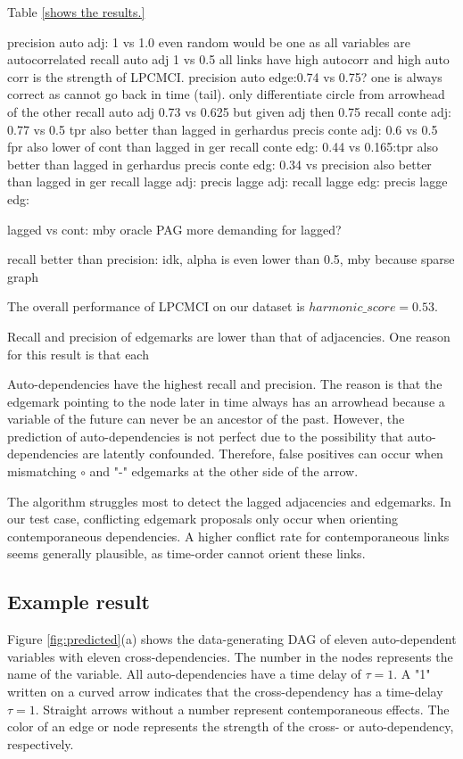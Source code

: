 \documentclass[conference]{IEEEtran}
\begin{document}
Table \ref{shows the results.} 

precision auto adj: 1 vs 1.0 even random would be one as all variables are autocorrelated
recall auto adj     1 vs 0.5 all links have high autocorr and high auto corr is the strength of LPCMCI.
precision auto edge:0.74 vs 0.75? one is always correct as cannot go back in time (tail). only differentiate circle from arrowhead of the other
recall auto adj     0.73 vs 0.625 but given adj then 0.75 
recall conte adj:   0.77 vs 0.5 tpr also better than lagged in gerhardus
precis conte adj:   0.6 vs 0.5 fpr also lower of cont than lagged in ger
recall conte edg:   0.44 vs 0.165:tpr also better than lagged in gerhardus
precis conte edg:   0.34 vs precision also better than lagged in ger
recall lagge adj:   
precis lagge adj:
recall lagge edg:   
precis lagge edg:

lagged vs cont: mby oracle PAG more demanding for lagged?

recall better than precision: idk, alpha is even lower than 0.5, mby because sparse graph

The overall performance of LPCMCI on our dataset is $harmonic\_score = 0.53$.


Recall and precision of edgemarks are lower than that of adjacencies. One reason for this result is that each 

Auto-dependencies have the highest recall and precision. The reason is that the edgemark pointing to the node later in time always has an arrowhead because a variable of the future can never be an ancestor of the past. However, the prediction of auto-dependencies is not perfect due to the possibility that auto-dependencies are latently confounded. Therefore, false positives can occur when mismatching $\circ$ and "-" edgemarks at the other side of the arrow.

The algorithm struggles most to detect the lagged adjacencies and edgemarks.
In our test case, conflicting edgemark proposals only occur when orienting contemporaneous dependencies. A higher conflict rate for contemporaneous links seems generally plausible, as time-order cannot orient these links.


\subsection{Example result}
Figure \ref{fig:predicted}(a) shows the data-generating DAG of eleven auto-dependent variables with eleven cross-dependencies.
The number in the nodes represents the name of the variable.
All auto-dependencies have a time delay of $\tau=1$.
A "1" written on a curved arrow indicates that the cross-dependency has a time-delay $\tau=1$. Straight arrows without a number represent contemporaneous effects. 
The color of an edge or node represents the strength of the cross- or auto-dependency, respectively.
\end{document}
